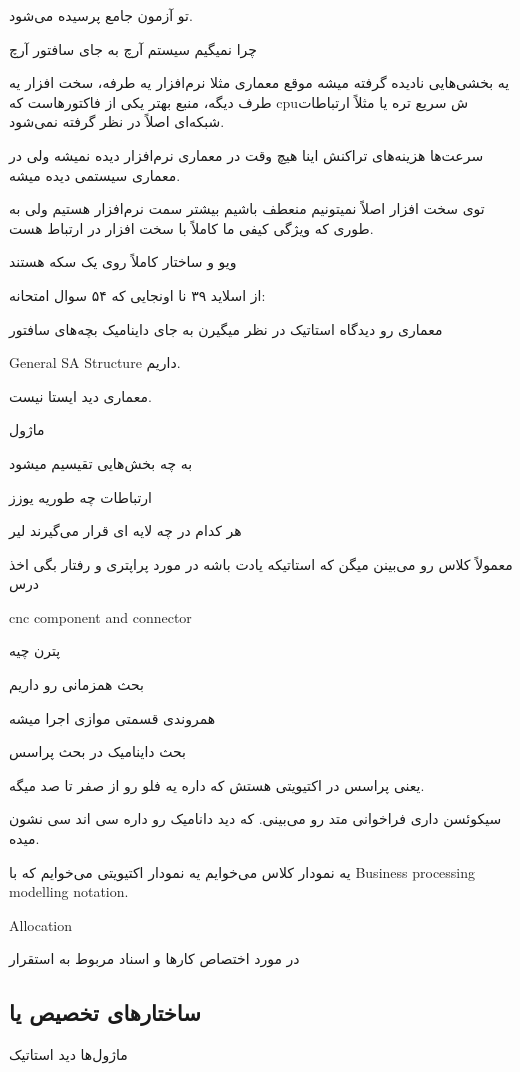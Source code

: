 تو آزمون جامع پرسیده می‌شود.

چرا نمیگیم سیستم آرچ به جای سافتور آرچ

یه بخشی‌هایی نادیده گرفته میشه موقع معماری مثلا نرم‌افزار یه طرفه، سخت افزار یه
طرف دیگه، منبع بهتر یکی از فاکتور‌هاست که cpuش سریع تره
یا مثلاً ارتباطات شبکه‌ای اصلاً در نظر گرفته نمی‌شود.

سرعت‌ها هزینه‌های تراکنش اینا هیچ وقت در معماری نرم‌افزار دیده نمیشه ولی در
معماری سیستمی دیده میشه.

توی سخت افزار اصلاً نمیتونیم منعطف باشیم بیشتر سمت نرم‌افزار هستیم ولی به طوری
که ویژگی کیفی ما کاملاً با سخت افزار در ارتباط هست.

ویو و ساختار کاملاً روی یک سکه هستند

از اسلاید ۳۹ نا اونجایی که ۵۴ سوال امتحانه:

معماری رو دیدگاه استاتیک در نظر میگیرن به جای داینامیک بچه‌های سافتور

General SA Structure داریم.

معماری دید ایستا نیست.

ماژول

به چه بخش‌هایی تقیسیم میشود

ارتباطات چه طوریه یوزز

هر کدام در چه لایه ای قرار می‌گیرند لیر

معمولاً کلاس رو می‌بینن میگن که استاتیکه یادت باشه در مورد پراپتری و رفتار بگی اخذ درس

cnc component and connector

پترن چیه

بحث همزمانی رو داریم

همروندی قسمتی موازی اجرا میشه

بحث داینامیک در بحث پراسس

یعنی پراسس در اکتیویتی هستش که داره یه فلو رو از صفر تا صد میگه.

سیکوئسن داری فراخوانی متد رو می‌بینی. که دید دانامیک رو داره سی اند سی نشون
میده.

یه نمودار کلاس می‌خوایم یه نمودار اکتیویتی می‌خوایم که با Business processing
modelling notation.

Allocation

در مورد اختصاص کار‌ها و اسناد مربوط به استقرار

\subsection{ساختار‌های تخصیص یا }

ماژول‌ها دید استاتیک

